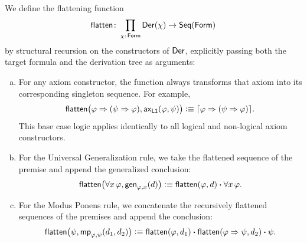 \begin{defn}
    We define the flattening function
    \[
        \fun{flatten}\colon\prod_{\chi\colon\fun{Form}}\fun{Der}(\chi)\to\fun{Seq}(\fun{Form})
    \]
    by structural recursion on the constructors of $\mathsf{Der}$, explicitly passing both the target formula and the derivation tree as arguments:
    \begin{enumerate}[a),font=\upshape]
        \item For any axiom constructor, the function always transforms that axiom into its corresponding singleton sequence. For example,
        \[
            \mathsf{flatten}\bigl(\varphi\mathrel{\Rightarrow}(\psi\mathrel{\Rightarrow}\varphi), \mathsf{ax}_{\mathsf{L1}}(\varphi,\psi)\bigr)
            \mathrel{\vcentcolon}\equiv{\lceil\varphi\mathrel{\Rightarrow}(\psi\mathrel{\Rightarrow}\varphi)\rceil}.
        \]
        This base case logic applies identically to all logical and non-logical axiom constructors.
        
        \item For the Universal Generalization rule, we take the flattened sequence of the premise and append the generalized conclusion:
        \[
            \mathsf{flatten}\bigl(\forall x\,\varphi, \mathsf{gen}_{\varphi,x}(d)\bigr) \mathrel{\vcentcolon}\equiv \mathsf{flatten}(\varphi, d) \mathbin{\boldsymbol{\cdot}} \forall x\,\varphi.
        \]
        
        \item For the Modus Ponens rule, we concatenate the recursively flattened sequences of the premises and append the conclusion:
        \[
            \mathsf{flatten}\bigl(\psi, \mathsf{mp}_{\varphi,\psi}(d_1,d_2)\bigr)
                \mathrel{\vcentcolon}\equiv
                    \mathsf{flatten}(\varphi, d_1)
                    \mathbin{\boldsymbol{\cdot}}
                    \mathsf{flatten}(\varphi\mathrel{\Rightarrow}\psi, d_2)
                    \mathbin{\boldsymbol{\cdot}}
                    \psi.
        \]
    \end{enumerate}
\end{defn}


